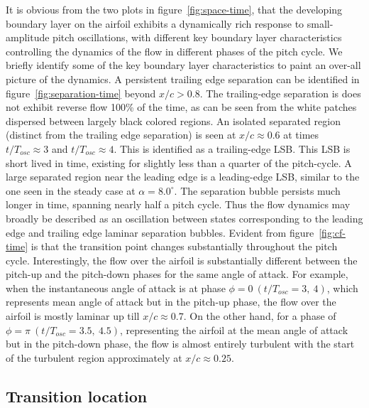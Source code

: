 It is obvious from the two plots in figure~\ref{fig:space-time}, that the developing boundary layer on the airfoil exhibits a dynamically rich response to small-amplitude pitch oscillations, with different key boundary layer characteristics controlling the dynamics of the flow in different phases of the pitch cycle. We briefly identify some of the key boundary layer characteristics to paint an over-all picture of the dynamics. A persistent trailing edge separation can be identified in figure~\ref{fig:separation-time} beyond $x/c>0.8$. The trailing-edge separation is does not exhibit reverse flow 100\% of the time, as can be seen from the white patches dispersed between largely black colored regions. An isolated separated region (distinct from the trailing edge separation) is seen at $x/c\approx0.6$ at times $t/T_{osc}\approx3$ and $t/T_{osc}\approx4$. This is identified as a trailing-edge LSB. This LSB is short lived in time, existing for slightly less than a quarter of the pitch-cycle. A large separated region near the leading edge is a leading-edge LSB, similar to the one seen in the steady case at $\alpha=8.0^{\circ}$. The separation bubble persists much longer in time, spanning nearly half a pitch cycle. Thus the flow dynamics may broadly be described as an oscillation between states corresponding to the leading edge and trailing edge laminar separation bubbles. Evident from figure~\ref{fig:cf-time} is that the transition point changes substantially throughout the pitch cycle. Interestingly, the flow over the airfoil is substantially different between the pitch-up and the pitch-down phases for the same angle of attack. For example, when the instantaneous angle of attack is at phase $\phi=0\ (t/T_{osc}=3,\ 4)$, which represents mean angle of attack but in the pitch-up phase, the flow over the airfoil is mostly laminar up till $x/c\approx0.7$. On the other hand, for a phase of $\phi=\pi\ (t/T_{osc}=3.5,\ 4.5)$, representing the airfoil at the mean angle of attack but in the pitch-down phase, the flow is almost entirely turbulent with the start of the turbulent region approximately at $x/c\approx0.25$.

\subsection{Transition location}

